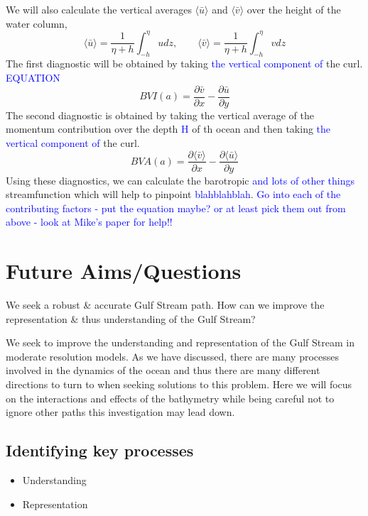 \documentclass[a4paper,11pt]{article}
\newcommand\td[1]{\textcolor{blue}{#1}}
\begin{document}
We will also calculate the vertical averages $\langle\bar{u}\rangle$ and $\langle\bar{v}\rangle$ over the height of the water column, 
\begin{equation}
	\langle\bar{u}\rangle = \frac{1}{\eta + h}\int_{-h}^{\eta}u dz ,\qquad \langle\bar{v}\rangle = \frac{1}{\eta + h}\int_{-h}^{\eta}v dz
\end{equation}
The first diagnostic will be obtained by taking \td{the vertical component of} the curl.
\td{EQUATION}
\begin{equation}
	BVI(a) = \frac{\partial \bar{v}}{\partial x} - \frac{\partial \bar{u}}{\partial y}
\end{equation}
The second diagnostic is obtained by taking the vertical average of the momentum contribution over the depth \td{H} of th ocean and then taking \td{the vertical component of} the curl. 
\begin{equation}
	BVA(a) = \frac{\partial \langle\bar{v}\rangle}{\partial x} - \frac{\partial \langle\bar{u}\rangle}{\partial y}
\end{equation}
	Using these diagnostics, we can calculate the barotropic \td{and lots of other things} streamfunction which will help to pinpoint \td{blahblahblah}.
	\td{Go into each of the contributing factors - put the equation maybe? or at least pick them out from above - look at Mike's paper for help!!}


\section{Future Aims/Questions}


We seek a robust \& accurate Gulf Stream path. How can we improve the representation \& thus understanding of the Gulf Stream?

We seek to improve the understanding and representation of the Gulf Stream in moderate resolution models. As we have discussed, there are many processes involved in the dynamics of the ocean and thus there are many different directions to turn to when seeking solutions to this problem. Here we will focus on the interactions and effects of the bathymetry while being careful not to ignore other paths this investigation may lead down. 

\subsection{Identifying key processes}
\begin{itemize}
  \item Understanding
  \item Representation
\end{itemize}
\end{document}
